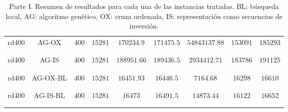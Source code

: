 \begin{table}[H]
{\begin{tabular}{c|cccccccc}
		rd400 &AG-OX & $400$ & $15281$ & $170234.9$ & $171475.5$ & $54843137.88$ & $153091$ & $185293$\\\\\\
		rd400 &AG-IS & $400$ & $15281$ & $188951.66$ & $189436.5$ & $2934412.71$ & $183786$ & $191125$\\\\\\
		rd400 &AG-OX-BL& $400$ & $15281$ & $16451.93$ & $16446.5$ & $7164.68$ & $16298$ & $16610$\\\\\\
		rd400 &AG-IS-BL& $400$ & $15281$ & $16473$ & $16491.5$ & $14873.44$ & $16122$ & $16652$\\\\\\
		\midrule 


		\bottomrule
	\end{tabular}
}
	\caption{Parte I. Resumen de resultados para cada una de las instancias tratadas. BL: búsqueda local, AG: algoritmo genético, OX: cruza ordenada, IS: representación como secuencias de inversión.}
	\label{results}

\end{table}


